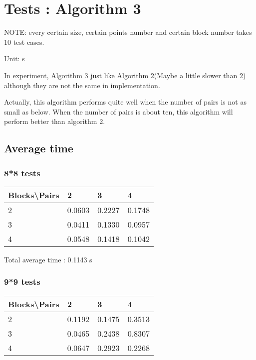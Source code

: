 \documentclass[12pt, a4paper]{article}
\begin{document}
	\section{Tests : Algorithm 3}

		NOTE: every certain size, certain points number and certain block number takes 10 test cases.

		Unit: s

		In experiment, Algorithm 3 just like Algorithm 2(Maybe a little slower than 2) although they are not the same in implementation.

		Actually, this algorithm performs quite well when the number of pairs is not as small as below. When the number of pairs is about ten, this algorithm will perform better than algorithm 2.

		\subsection{Average time}

			\subsubsection{8*8 tests}

				\begin{tabular}[h]{|l|l|l|l|}
				\hline
				Blocks\textbackslash Pairs & 2 & 3 & 4 \\
				\hline
				2 & 0.0603 & 0.2227 & 0.1748 \\
				\hline
				3 & 0.0411 & 0.1330 & 0.0957 \\
				\hline
				4 & 0.0548 & 0.1418 & 0.1042 \\
				\hline
				\end{tabular}

				Total average time : 0.1143 s

			\subsubsection{9*9 tests}

				\begin{tabular}[h]{|l|l|l|l|}
				\hline
				Blocks\textbackslash Pairs & 2 & 3 & 4 \\
				\hline
				2 & 0.1192 & 0.1475 & 0.3513 \\
				\hline
				3 & 0.0465 & 0.2438 & 0.8307 \\
				\hline
				4 & 0.0647 & 0.2923 & 0.2268 \\
				\hline
				\end{tabular}
\end{document}
